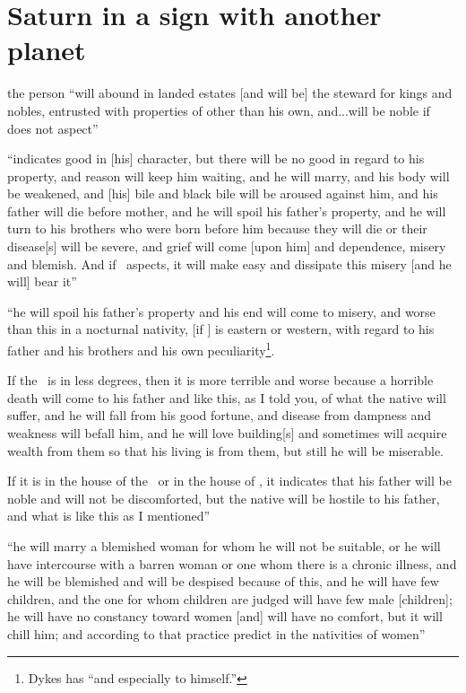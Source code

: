 \section{Saturn in a sign with another planet}
\begin{description}[style=multiline,leftmargin=1.5cm]
\item[\Saturn,\Jupiter]
the person ``will abound in landed estates [and will be] the steward for kings and nobles, entrusted with properties of other than his own, and...will be noble if \Mars\, does not aspect''

\item[\Saturn,\Mars]
``indicates good in [his] character, but there will be no good in regard to his property, and reason will keep him waiting, and he will marry, and his body will be weakened, and [his] bile and black bile will be aroused against him, and his father will die before mother, and he will spoil his father's property, and he will turn to his brothers who were born before him because they will die or their disease[s] will be severe, and grief will come [upon him] and dependence, misery and blemish. And if \Jupiter\, aspects, it will make easy and dissipate this misery [and he will] bear it''

\item[\Saturn,\Sun] ``he will spoil his father's property and his end will come to misery, and worse than this in a nocturnal nativity, [if \Saturn] is eastern or western, with regard to his father and his brothers and his own peculiarity\footnote{Dykes has ``and especially to himself.''}. 

If the \Sun\, is in less degrees, then it is more terrible and worse because a horrible death will come to his father and like this, as I told you, of what the native will suffer, and he will fall from his good fortune, and disease from dampness and weakness will befall him, and he will love building[s] and sometimes will acquire wealth from them so that his living is from them, but still he will be miserable. 

If it is in the house of the \Sun\, or in the house of \Saturn, it indicates that his father will be noble and will not be discomforted, but the native will be hostile to his father, and what is like this as I mentioned''

\item[\Saturn,\Venus]
``he will marry a blemished woman for whom he will not be suitable, or he will have intercourse with a barren woman or one whom there is a chronic illness, and he will be blemished and will be despised because of this, and he will have few children, and the one for whom children are judged will have few male [children]; he will have no constancy toward women [and] will have no comfort, but it will chill him; and according to that practice predict in the nativities of women''


\end{description}
